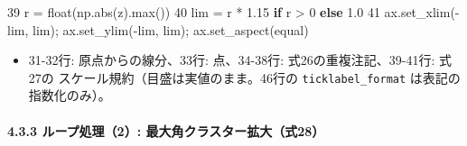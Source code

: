 \documentclass[
  a4paper,
]{ltjsarticle}
\newenvironment{Shaded}{}{}
\newcommand{\BuiltInTok}[1]{\textcolor[rgb]{0.00,0.50,0.00}{#1}}
\newcommand{\ControlFlowTok}[1]{\textcolor[rgb]{0.00,0.44,0.13}{\textbf{#1}}}
\newcommand{\DecValTok}[1]{\textcolor[rgb]{0.25,0.63,0.44}{#1}}
\newcommand{\FloatTok}[1]{\textcolor[rgb]{0.25,0.63,0.44}{#1}}
\newcommand{\NormalTok}[1]{#1}
\newcommand{\OperatorTok}[1]{\textcolor[rgb]{0.40,0.40,0.40}{#1}}
\newcommand{\StringTok}[1]{\textcolor[rgb]{0.25,0.44,0.63}{#1}}
\providecommand{\tightlist}{%
  \setlength{\itemsep}{0pt}\setlength{\parskip}{0pt}}
\begin{document}
\begin{Shaded}
\begin{Highlighting}[]
    \DecValTok{39}\NormalTok{          r }\OperatorTok{=} \BuiltInTok{float}\NormalTok{(np.}\BuiltInTok{abs}\NormalTok{(z).}\BuiltInTok{max}\NormalTok{())}
    \DecValTok{40}\NormalTok{          lim }\OperatorTok{=}\NormalTok{ r }\OperatorTok{*} \FloatTok{1.15} \ControlFlowTok{if}\NormalTok{ r }\OperatorTok{\textgreater{}} \DecValTok{0} \ControlFlowTok{else} \FloatTok{1.0}
    \DecValTok{41}\NormalTok{          ax.set\_xlim(}\OperatorTok{{-}}\NormalTok{lim, lim)}\OperatorTok{;}\NormalTok{ ax.set\_ylim(}\OperatorTok{{-}}\NormalTok{lim, lim)}\OperatorTok{;}\NormalTok{ ax.set\_aspect(}\StringTok{\textquotesingle{}equal\textquotesingle{}}\NormalTok{)}
\end{Highlighting}
\end{Shaded}

\begin{itemize}
\tightlist
\item
  31-32行: 原点からの線分、33行: 点、34-38行: 式26の重複注記、39-41行:
  式27の スケール規約（目盛は実値のまま。46行の
  \texttt{ticklabel\_format} は表記の指数化のみ）。
\end{itemize}

\paragraph{4.3.3 ループ処理（2）:
最大角クラスター拡大（式28）}\label{ux30ebux30fcux30d7ux51e6ux74062-ux6700ux5927ux89d2ux30afux30e9ux30b9ux30bfux30fcux62e1ux5927ux5f0f28}
\end{document}
